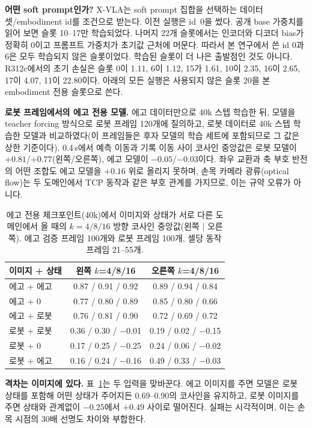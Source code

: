 \documentclass[conference,10pt]{IEEEtran}
\begin{document}
\textbf{어떤 soft prompt인가?} X-VLA는 soft prompt 집합을 선택하는 데이터셋/embodiment id를 조건으로 받는다. 이전 실행은 id~0을
썼다. 공개 base 가중치를 읽어 보면 슬롯 10--17만 학습되었다. 나머지 22개 슬롯에서는 인코더와 디코더 bias가 정확히 0이고 프롬프트
가중치가 초기값 근처에 머문다. 따라서 본 연구에서 쓴 id 0과 6은 모두 학습되지 않은 슬롯이었다. 학습된 슬롯이 더 나은 출발점인 것도
아니다. R312c에서의 초기 손실은 슬롯 0이 1.11, 6이 1.12, 15가 1.61, 10이 2.35, 16이 2.65, 17이 4.07, 11이 22.80이다. 아래의 모든 실행은
사용되지 않은 슬롯 20을 본 embodiment 전용 슬롯으로 쓴다.

\textbf{로봇 프레임에서의 에고 전용 모델.} 에고 데이터만으로 40k 스텝 학습한 뒤, 모델을 teacher forcing 방식으로 로봇 프레임 120개에
질의하고, 로봇 데이터로 40k 스텝 학습한 모델과 비교하였다(이 프레임들은 후자 모델의 학습 세트에 포함되므로 그 값은 상한 기준이다).
0.4\,s에서 예측 이동과 기록 이동 사이 코사인 중앙값은 로봇 모델이 $+0.81$/$+0.77$(왼쪽/오른쪽), 에고 모델이 $-0.05$/$-0.03$이다.
좌우 교환과 축 부호 반전의 어떤 조합도 에고 모델을 $+0.16$ 위로 올리지 못하며, 손목 카메라 광류(optical flow)는 두 도메인에서 TCP
동작과 같은 부호 관계를 가지므로, 이는 규약 오류가 아니다.

\begin{table}[t]
\centering\footnotesize\setlength{\tabcolsep}{3.2pt}
\caption{에고 전용 체크포인트(40k)에서 이미지와 상태가 서로 다른 도메인에서 올 때의 $k{=}4/8/16$ 방향 코사인 중앙값(왼쪽 $|$ 오른쪽).
에고 검증 프레임 100개와 로봇 프레임 100개, 셀당 동작 프레임 21--55개.}
\label{tab:ablation}
\begin{tabular}{@{}lcc@{}}
\toprule
이미지 + 상태 & 왼쪽 $k$=4/8/16 & 오른쪽 $k$=4/8/16 \\
\midrule
에고 + 에고 & 0.87 / 0.91 / 0.92 & 0.89 / 0.94 / 0.84 \\
에고 + 0 & 0.77 / 0.80 / 0.89 & 0.85 / 0.80 / 0.66 \\
에고 + 로봇 & 0.76 / 0.81 / 0.90 & 0.72 / 0.69 / 0.72 \\
로봇 + 로봇 & 0.36 / 0.30 / $-$0.01 & 0.19 / 0.02 / $-$0.15 \\
로봇 + 0 & 0.17 / 0.25 / $-$0.25 & 0.24 / 0.06 / $-$0.02 \\
로봇 + 에고 & 0.16 / 0.24 / $-$0.16 & 0.49 / 0.33 / $-$0.03 \\
\bottomrule
\end{tabular}
\end{table}

\textbf{격차는 이미지에 있다.} 표~\ref{tab:ablation}는 두 입력을 맞바꾼다. 에고 이미지를 주면 모델은 로봇 상태를 포함해 어떤 상태가
주어지든 0.69--0.90의 코사인을 유지하고, 로봇 이미지를 주면 상태와 관계없이 $-0.25$에서 $+0.49$ 사이로 떨어진다. 실패는 시각적이며,
이는 손목 시점의 30배 선명도 차이와 부합한다.
\end{document}
